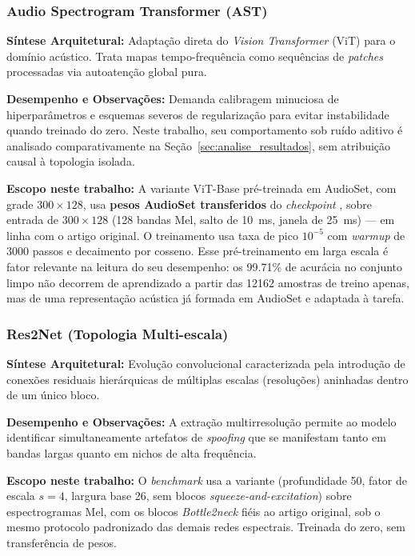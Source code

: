 \documentclass[12pt,a4paper]{article}
\begin{document}
\subsubsection[Audio Spectrogram Transformer (AST)]{Audio Spectrogram Transformer (AST)~\cite{gong2021ast}}
\textbf{Síntese Arquitetural:} Adaptação direta do \textit{Vision Transformer} (ViT) para o domínio acústico. Trata mapas tempo-frequência como sequências de \textit{patches} processadas via autoatenção global pura.
\par\textbf{Desempenho e Observações:} Demanda calibragem minuciosa de hiperparâmetros e esquemas severos de regularização para evitar instabilidade quando treinado do zero. Neste trabalho, seu comportamento sob ruído aditivo é analisado comparativamente na Seção~\ref{sec:analise_resultados}, sem atribuição causal à topologia isolada.
\par\textbf{Escopo neste trabalho:} A variante ViT-Base pré-treinada em
AudioSet, com grade $300 \times 128$, usa \textbf{pesos AudioSet transferidos} do
\textit{checkpoint}
, sobre entrada de
$300 \times 128$ (\num{128} bandas Mel, salto de \SI{10}{\milli\second}, janela
de \SI{25}{\milli\second}) --- em linha com o artigo original. O treinamento
usa taxa de pico $10^{-5}$ com \textit{warmup} de \num{3000} passos e
decaimento por cosseno. Esse pré-treinamento em larga escala é fator relevante
na leitura do seu desempenho: os \num{99,71}\% de acurácia no conjunto limpo não decorrem de
aprendizado a partir das \num{12162} amostras de treino apenas, mas de uma
representação acústica já formada em AudioSet e adaptada à tarefa.

\subsubsection[Res2Net (Topologia Multi-escala)]{Res2Net (Topologia Multi-escala)~\cite{gao2021res2net}}
\textbf{Síntese Arquitetural:} Evolução convolucional caracterizada pela introdução de conexões residuais hierárquicas de múltiplas escalas (resoluções) aninhadas dentro de um único bloco.
\par\textbf{Desempenho e Observações:} A extração multirresolução permite ao modelo identificar simultaneamente artefatos de \textit{spoofing} que se manifestam tanto em bandas largas quanto em nichos de alta frequência.
\par\textbf{Escopo neste trabalho:} O \textit{benchmark} usa a variante
 (profundidade 50,
fator de escala $s=4$, largura base \num{26}, sem blocos
\textit{squeeze-and-excitation}) sobre espectrogramas Mel, com os blocos
\textit{Bottle2neck} fiéis ao artigo original, sob o mesmo protocolo
padronizado das demais redes espectrais. Treinada do zero, sem transferência
de pesos.
\end{document}
